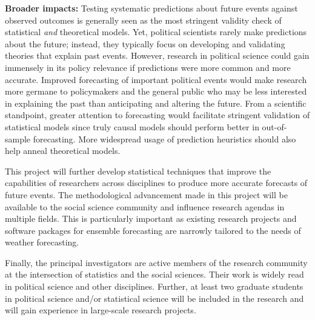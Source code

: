 \documentclass[pdftex,11pt,fullpage,oneside]{amsart}
\begin{document}
{\bf Broader impacts:} Testing systematic predictions about future
events against observed outcomes is generally seen as the most
stringent validity check of statistical \emph{and} theoretical models.
Yet, political scientists rarely make predictions about the future;
instead, they typically focus on developing and validating theories
that explain past events. However, research in political science could
gain immensely in its policy relevance if predictions were more common
and more accurate.  Improved forecasting of important political events
would make research more germane to policymakers and the general
public who may be less interested in explaining the past than
anticipating and altering the future.  From a scientific standpoint,
greater attention to forecasting would facilitate stringent validation
of statistical models since truly causal models should perform better
in out-of-sample forecasting. More widespread usage of prediction
heuristics should also help anneal theoretical models.

This project will further develop statistical techniques that improve
the capabilities of researchers across disciplines to produce more
accurate forecasts of future events. The methodological advancement
made in this project will be available to the social science community
and influence research agendas in multiple fields.  This is
particularly important as existing research projects and software
packages for ensemble forecasting are narrowly tailored to the needs
of weather forecasting.

Finally, the principal investigators are active members of the
research community at the intersection of statistics and the social
sciences. Their work is widely read in political science and other
disciplines. Further, at least two graduate students in political
science and/or statistical science will be included in the research and
will gain experience in large-scale research projects.
\end{document}
